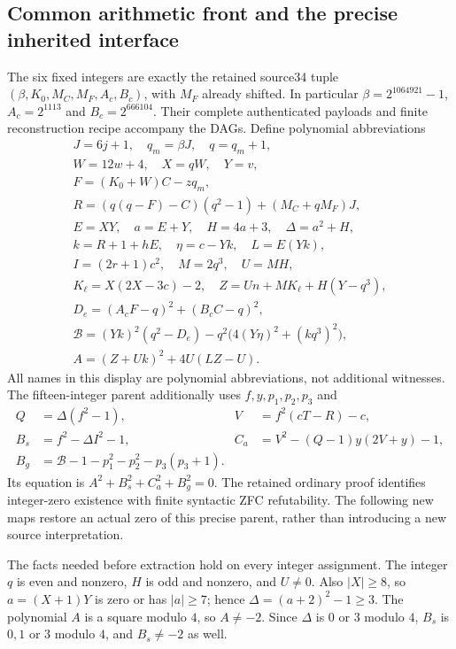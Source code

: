 \subsection{Common arithmetic front and the precise inherited interface}
The six fixed integers are exactly the retained source34 tuple
$(\beta,K_0,M_C,M_F,A_c,B_c)$, with $M_F$ already shifted. In particular
$\beta=2^{1064921}-1$, $A_c=2^{1113}$ and $B_c=2^{666104}$.
Their complete authenticated payloads and finite reconstruction recipe
accompany the DAGs. Define polynomial abbreviations
\[
\begin{gathered}
J=6j+1,\quad q_m=\beta J,\quad q=q_m+1,\\
W=12w+4,\quad X=qW,\quad Y=v,\\
F=(K_0+W)C-zq_m,\\
R=(q(q-F)-C)(q^2-1)+(M_C+qM_F)J,\\
E=XY,\quad a=E+Y,\quad H=4a+3,\quad\Delta=a^2+H,\\
k=R+1+hE,\quad\eta=c-Yk,\quad L=E(Yk),\\
I=(2r+1)c^2,\quad M=2q^3,\quad U=MH,\\
K_\ell=X(2X-3c)-2,\quad Z=Un+MK_\ell+H(Y-q^3),\\
D_e=(A_cF-q)^2+(B_cC-q)^2,\\
\mathcal B=(Yk)^2(q^2-D_e)-q^2\bigl(4(Y\eta)^2+(kq^3)^2\bigr),\\
A=(Z+Uk)^2+4U(LZ-U).
\end{gathered}
\]
All names in this display are polynomial abbreviations, not additional witnesses.
The fifteen-integer parent additionally uses $f,y,p_1,p_2,p_3$ and
\begin{align*}
 Q&=\Delta(f^2-1),&V&=f^2(cT-R)-c,\\
 B_s&=f^2-\Delta I^2-1,&
 C_a&=V^2-(Q-1)y(2V+y)-1,\\
 B_g&=\mathcal B-1-p_1^2-p_2^2-p_3(p_3+1).
\end{align*}
Its equation is $A^2+B_s^2+C_a^2+B_g^2=0$.
The retained ordinary proof identifies integer-zero existence with finite
syntactic ZFC refutability. The following new maps restore an actual zero of
this precise parent, rather than introducing a new source interpretation.

The facts needed before extraction hold on every integer assignment.
The integer $q$ is even and nonzero, $H$ is odd and nonzero, and $U\ne0$.
Also $|X|\ge8$, so $a=(X+1)Y$ is zero or has $|a|\ge7$; hence
$\Delta=(a+2)^2-1\ge3$. The polynomial $A$ is a square modulo $4$,
so $A\ne-2$. Since $\Delta$ is $0$ or $3$ modulo $4$, $B_s$ is $0,1$
or $3$ modulo $4$, and $B_s\ne-2$ as well.

